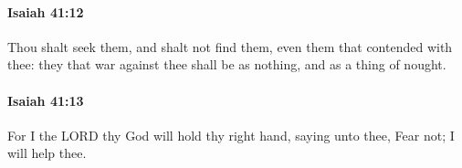 		\paragraph{Isaiah 41:12} %
			\label{ISAIAH-41-12}

			Thou shalt seek them, and shalt not find them, even them that contended with thee: they that war against thee shall be as nothing, and as a thing of nought.


		\paragraph{Isaiah 41:13} %
			\label{ISAIAH-41-13}

			For I the LORD thy God will hold thy right hand, saying unto thee, Fear not; I will help thee.


